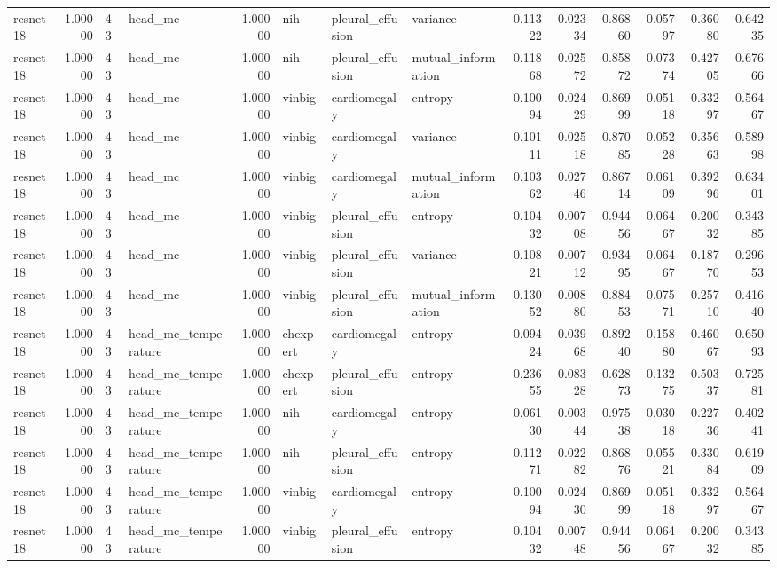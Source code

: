 \begin{tabular}{lrllrlllrrrrrr}
resnet18 & 1.00000 & 43 & head\_mc & 1.00000 & nih & pleural\_effusion & variance & 0.11322 & 0.02334 & 0.86860 & 0.05797 & 0.36080 & 0.64235 \\
resnet18 & 1.00000 & 43 & head\_mc & 1.00000 & nih & pleural\_effusion & mutual\_information & 0.11868 & 0.02572 & 0.85872 & 0.07374 & 0.42705 & 0.67666 \\
resnet18 & 1.00000 & 43 & head\_mc & 1.00000 & vinbig & cardiomegaly & entropy & 0.10094 & 0.02429 & 0.86999 & 0.05118 & 0.33297 & 0.56467 \\
resnet18 & 1.00000 & 43 & head\_mc & 1.00000 & vinbig & cardiomegaly & variance & 0.10111 & 0.02518 & 0.87085 & 0.05228 & 0.35663 & 0.58998 \\
resnet18 & 1.00000 & 43 & head\_mc & 1.00000 & vinbig & cardiomegaly & mutual\_information & 0.10362 & 0.02746 & 0.86714 & 0.06109 & 0.39296 & 0.63401 \\
resnet18 & 1.00000 & 43 & head\_mc & 1.00000 & vinbig & pleural\_effusion & entropy & 0.10432 & 0.00708 & 0.94456 & 0.06467 & 0.20032 & 0.34385 \\
resnet18 & 1.00000 & 43 & head\_mc & 1.00000 & vinbig & pleural\_effusion & variance & 0.10821 & 0.00712 & 0.93495 & 0.06467 & 0.18770 & 0.29653 \\
resnet18 & 1.00000 & 43 & head\_mc & 1.00000 & vinbig & pleural\_effusion & mutual\_information & 0.13052 & 0.00880 & 0.88453 & 0.07571 & 0.25710 & 0.41640 \\
resnet18 & 1.00000 & 43 & head\_mc\_temperature & 1.00000 & chexpert & cardiomegaly & entropy & 0.09424 & 0.03968 & 0.89240 & 0.15880 & 0.46067 & 0.65093 \\
resnet18 & 1.00000 & 43 & head\_mc\_temperature & 1.00000 & chexpert & pleural\_effusion & entropy & 0.23655 & 0.08328 & 0.62873 & 0.13275 & 0.50337 & 0.72581 \\
resnet18 & 1.00000 & 43 & head\_mc\_temperature & 1.00000 & nih & cardiomegaly & entropy & 0.06130 & 0.00344 & 0.97538 & 0.03018 & 0.22736 & 0.40241 \\
resnet18 & 1.00000 & 43 & head\_mc\_temperature & 1.00000 & nih & pleural\_effusion & entropy & 0.11271 & 0.02282 & 0.86876 & 0.05521 & 0.33084 & 0.61909 \\
resnet18 & 1.00000 & 43 & head\_mc\_temperature & 1.00000 & vinbig & cardiomegaly & entropy & 0.10094 & 0.02430 & 0.86999 & 0.05118 & 0.33297 & 0.56467 \\
resnet18 & 1.00000 & 43 & head\_mc\_temperature & 1.00000 & vinbig & pleural\_effusion & entropy & 0.10432 & 0.00748 & 0.94456 & 0.06467 & 0.20032 & 0.34385 \\

\end{tabular}
